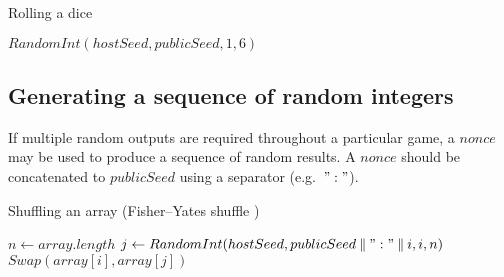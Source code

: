 \documentclass[a4paper]{article}
\theoremstyle{definition}
\theoremstyle{remark}
\newcommand{\concat}{\mathbin{\|}}
\begin{document}
\begin{algorithm}[H]
\caption{Rolling a dice}
\begin{algorithmic}
	\State \Return \(RandomInt(hostSeed, publicSeed, 1, 6)\)
\EndFunction
\end{algorithmic}
\end{algorithm}

\subsection{Generating a sequence of random integers}
If multiple random outputs are required throughout a particular game, a \(nonce\) may be used to produce a sequence of random results. A \(nonce\) should be concatenated to \(publicSeed\) using a separator (e.g.\ \(":"\)).

\begin{algorithm}[H]
\caption{Shuffling an array (Fisher--Yates shuffle \cite{fisheryates1948, durstenfeld1964})}
\begin{algorithmic}
	\State \(n \gets array.length\)
		\State \(j \gets RandomInt(hostSeed, publicSeed \concat ":" \concat i, i, n)\)
		\State \(Swap(array[i], array[j])\)
	\EndFor
\EndFunction
\end{algorithmic}
\end{algorithm}

\printbibliography
\end{document}
